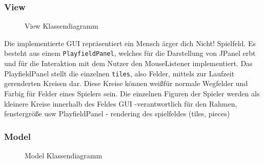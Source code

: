 \documentclass[conference]{IEEEtran}
\begin{document}
\subsubsection{View}
\begin{figure}[]
    \centering
    \caption{View Klassendiagramm}
\end{figure}

Die implementierte GUI repr\"asentiert ein Mensch \"arger dich Nicht! Spielfeld. Es besteht aus einem \texttt{PlayfieldPanel}, welches f\"ur die Darstellung von JPanel erbt und f\"ur die Interaktion mit dem Nutzer den MouseListener implementiert. Das PlayfieldPanel stellt die einzelnen \texttt{tiles}, also Felder, mittels zur Laufzeit gerenderten Kreisen dar. Diese Kreise k\"onnen wei\ss   f\"ur normale Wegfelder und Farbig f\"ur Felder eines Spielers sein. 
  Die einzelnen Figuren der Spieler werden als kleinere Kreise innerhalb des Feldes 
    GUI
       -verantwortlich f\"ur den Rahmen, fenstergr\"o\ss e usw
    PlayfieldPanel
        - rendering des spielfeldes (tiles, pieces)

\subsubsection{Model}
\begin{figure}[]
    \centering
    \caption{Model Klassendiagramm}
\end{figure}
\end{document}
